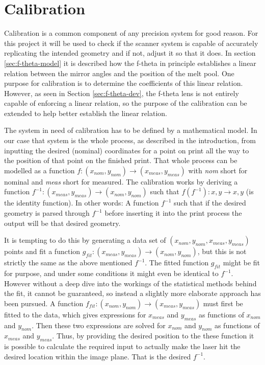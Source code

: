 \chapter{Calibration} \label{chap:cal}

Calibration is a common component of any precision system for good reason. For this project it will be used to check if the scanner system is capable of accurately replicating the intended geometry and if not, adjust it so that it does. In section \ref{sec:f-theta-model} it is described how the f-theta in principle establishes a linear relation between the mirror angles and the position of the melt pool. One purpose for calibration is to determine the coefficients of this linear relation. However, as seen in Section \ref{sec:f-theta-dev}, the f-theta lens is not entirely capable of enforcing a linear relation, so the purpose of the calibration can be extended to help better establish the linear relation.

The system in need of calibration has to be defined by a mathematical model. In our case that system is the whole process, as described in the introduction, from inputting the desired (nominal) coordinates for a point on print all the way to the position of that point on the finished print. That whole process can be modelled as a function $f: (x_{nom}, y_{nom}) \rightarrow  (x_{meas}, y_{meas})$ with \textit{nom} short for nominal and \textit{meas} short for measured. The calibration works by deriving a function $f^{-1}: (x_{meas}, y_{meas}) \rightarrow  (x_{nom}, y_{nom})$ such that $f(f^{-1}): x, y \rightarrow  x, y$ (is the identity function). In other words: A function $f^{-1}$ such that if the desired geometry is parsed through $f^{-1}$ before inserting it into the print process the output will be that desired geometry. 

It is tempting to do this by generating a data set of $(x_{nom}, y_{nom}, x_{meas}, y_{meas})$ points and fit a function $g_{fit}: (x_{meas}, y_{meas}) \rightarrow  (x_{nom}, y_{nom})$, but this is not strictly the same as the above mentioned $f^{-1}$. The fitted function $g_{fit}$ might be fit for purpose, and under some conditions it might even be identical to $f^{-1}$. However without a deep dive into the workings of the statistical methods behind the fit, it cannot be guaranteed, so instead a slightly more elaborate approach has been pursued. A function $f_{fit}: (x_{nom}, y_{nom}) \rightarrow  (x_{meas}, y_{meas})$ must first be fitted to the data, which gives expressions for $x_{meas}$ and $y_{meas}$ as functions of $x_{nom}$ and $y_{nom}$. Then these two expressions are solved for $x_{nom}$ and $y_{nom}$ as functions of $x_{meas}$ and $y_{meas}$. Thus, by providing the desired position to the these function it is possible to calculate the required input to actually make the laser hit the desired location within the image plane. That is the desired $f^{-1}$.

